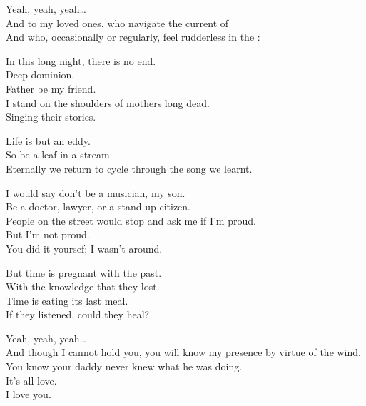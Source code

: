 



Yeah, yeah, yeah… \\
And to my loved ones, who navigate the current of  \\
And who, occasionally or regularly, feel rudderless in the : \\


In this long night, there is no end. \\
Deep dominion. \\
Father be my friend. \\
I stand on the shoulders of mothers long dead. \\
Singing their stories. \\


Life is but an eddy. \\
So be a leaf in a stream. \\
Eternally we return to cycle through the song we learnt. \\


I would say don't be a musician, my son. \\
Be a doctor, lawyer, or a stand up citizen. \\
People on the street would stop and ask me if I'm proud. \\
But I'm not proud. \\
You did it yoursef; I wasn't around. \\


But time is pregnant with the past. \\
With the knowledge that they lost. \\
Time is eating its last meal. \\
If they listened, could they heal? \\


Yeah, yeah, yeah… \\
And though I cannot hold you, you will know my presence by virtue of the wind. \\
You know your daddy never knew what he was doing. \\
It's all love. \\
I love you. \\

